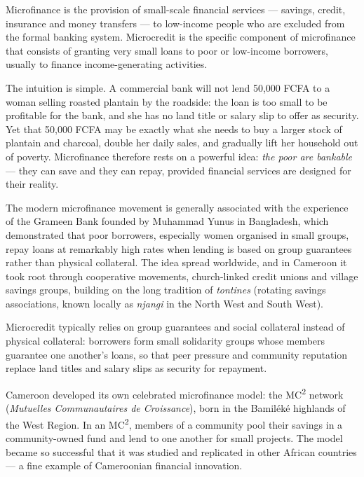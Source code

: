 \documentclass[11pt]{article}
\newcommand{\cle}[1]{{\popxbold\color{popdark}#1}}
\newcounter{popsec}
\newcounter{popsub}
\newcommand{\courssub}[1]{%
  \stepcounter{popsub}%
  \par\vspace{9pt}\noindent{\popxbold\fontsize{11.5}{13}\selectfont\color{popink}{\color{poporange}\thepopsec.\thepopsub}\hspace{6pt}#1}\par\nopagebreak\vspace{4pt}
}
\begin{document}
\courssub{Definition and Origin of Microfinance}

\begin{definition}[Microfinance]
\cle{Microfinance} is the provision of small-scale financial services — savings, credit, insurance and money transfers — to low-income people who are excluded from the formal banking system. \cle{Microcredit} is the specific component of microfinance that consists of granting very small loans to poor or low-income borrowers, usually to finance income-generating activities.
\end{definition}

The intuition is simple. A commercial bank will not lend 50,000 FCFA to a woman selling roasted plantain by the roadside: the loan is too small to be profitable for the bank, and she has no land title or salary slip to offer as security. Yet that 50,000 FCFA may be exactly what she needs to buy a larger stock of plantain and charcoal, double her daily sales, and gradually lift her household out of poverty. Microfinance therefore rests on a powerful idea: \emph{the poor are bankable} — they can save and they can repay, provided financial services are designed for their reality.

The modern microfinance movement is generally associated with the experience of the Grameen Bank founded by Muhammad Yunus in Bangladesh, which demonstrated that poor borrowers, especially women organised in small groups, repay loans at remarkably high rates when lending is based on \cle{group guarantees} rather than physical collateral. The idea spread worldwide, and in Cameroon it took root through cooperative movements, church-linked credit unions and village savings groups, building on the long tradition of \emph{tontines} (rotating savings associations, known locally as \emph{njangi} in the North West and South West).

\begin{propriete}
Microcredit typically relies on \cle{group guarantees} and \cle{social collateral} instead of physical collateral: borrowers form small solidarity groups whose members guarantee one another's loans, so that peer pressure and community reputation replace land titles and salary slips as security for repayment.
\end{propriete}

\begin{savaistu}
Cameroon developed its own celebrated microfinance model: the \cle{MC\textsuperscript{2}} network (\emph{Mutuelles Communautaires de Croissance}), born in the Bamiléké highlands of the West Region. In an MC\textsuperscript{2}, members of a community pool their savings in a community-owned fund and lend to one another for small projects. The model became so successful that it was studied and replicated in other African countries — a fine example of Cameroonian financial innovation.
\end{savaistu}
\end{document}
